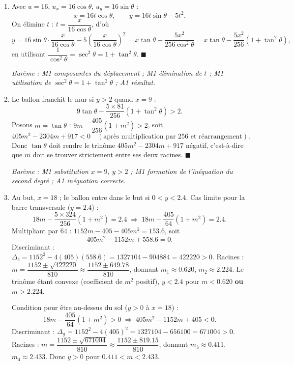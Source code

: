 \documentclass[11pt]{article}
\begin{document}
\begin{corrige}
\begin{enumerate}
\item Avec $u = 16$, $u_x = 16\cos\theta$, $u_y = 16\sin\theta$ :
\[ x = 16t\cos\theta, \qquad y = 16t\sin\theta - 5t^2. \]
On \'elimine $t$ : $t = \dfrac{x}{16\cos\theta}$, d'o\`u
\[ y = 16\sin\theta \cdot \frac{x}{16\cos\theta} - 5\left(\frac{x}{16\cos\theta}\right)^2 = x\tan\theta - \frac{5x^2}{256\cos^2\theta} = x\tan\theta - \frac{5x^2}{256}\left(1 + \tan^2\theta\right), \]
en utilisant $\dfrac{1}{\cos^2\theta} = \sec^2\theta = 1 + \tan^2\theta$. $\blacksquare$

\emph{Bar\`eme : M1 composantes du d\'eplacement ; M1 \'elimination de $t$ ; M1 utilisation de $\sec^2\theta = 1 + \tan^2\theta$ ; A1 r\'esultat.}

\item Le ballon franchit le mur si $y > 2$ quand $x = 9$ :
\[ 9\tan\theta - \frac{5 \times 81}{256}\left(1 + \tan^2\theta\right) > 2. \]
Posons $m = \tan\theta$ : $9m - \dfrac{405}{256}(1 + m^2) > 2$, soit
\[ 405m^2 - 2304m + 917 < 0 \quad (\text{apr\`es multiplication par } 256 \text{ et r\'earrangement}). \]
Donc $\tan\theta$ doit rendre le trin\^ome $405m^2 - 2304m + 917$ n\'egatif, c'est-\`a-dire que $m$ doit se trouver strictement entre ses deux racines. $\blacksquare$

\emph{Bar\`eme : M1 substitution $x = 9$, $y > 2$ ; M1 formation de l'in\'equation du second degr\'e ; A1 in\'equation correcte.}

\item Au but, $x = 18$ ; le ballon entre dans le but si $0 < y < 2.4$.
Cas limite pour la barre transversale ($y = 2.4$) :
\[ 18m - \frac{5 \times 324}{256}(1 + m^2) = 2.4 \;\Longrightarrow\; 18m - \frac{405}{64}(1 + m^2) = 2.4. \]
Multipliant par $64$ : $1152m - 405 - 405m^2 = 153.6$, soit
\[ 405m^2 - 1152m + 558.6 = 0. \]
Discriminant : $\Delta_c = 1152^2 - 4(405)(558.6) = 1327104 - 904884 = 422220 > 0$.
Racines : $m = \dfrac{1152 \pm \sqrt{422220}}{810} \approx \dfrac{1152 \pm 649.78}{810}$, donnant $m_1 \approx 0.620$, $m_2 \approx 2.224$.
Le trin\^ome \'etant convexe (coefficient de $m^2$ positif), $y < 2.4$ pour $m < 0.620$ \textbf{ou} $m > 2.224$.

Condition pour \^etre au-dessus du sol ($y > 0$ \`a $x = 18$) :
\[ 18m - \frac{405}{64}(1+m^2) > 0 \;\Longrightarrow\; 405m^2 - 1152m + 405 < 0. \]
Discriminant : $\Delta_g = 1152^2 - 4(405)^2 = 1327104 - 656100 = 671004 > 0$.
Racines : $m = \dfrac{1152 \pm \sqrt{671004}}{810} \approx \dfrac{1152 \pm 819.15}{810}$, donnant $m_3 \approx 0.411$, $m_4 \approx 2.433$.
Donc $y > 0$ pour $0.411 < m < 2.433$.


\end{enumerate}
\end{corrige}
\end{document}
